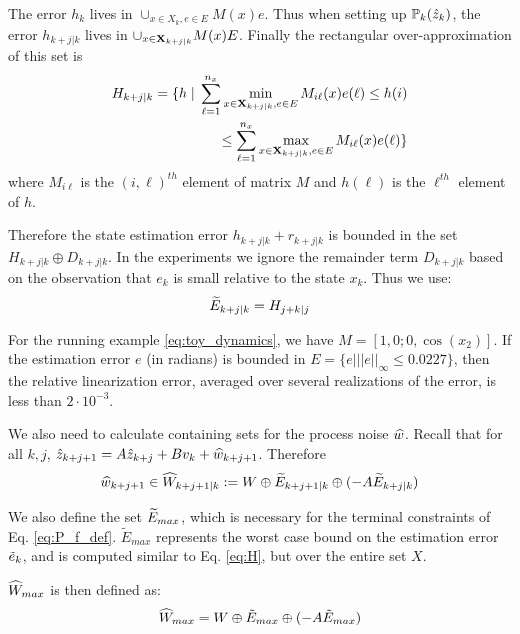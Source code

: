 The error $h_{k}$ lives in 
$\cup_{x\in X_{k}, e \in E}M(x)e$.
Thus when setting up $\mathbb{P}_{k}(\hat{z}_{k})$, the error $h_{k+j|k}$ lives in $\cup_{x \in \mathbf{X}_{k+j|k}}M(x)E$.
Finally the rectangular over-approximation of this set is 
\begin{eqnarray}
\label{eq:H}
H_{k+j|k} = \{h \;|\; \sum_{\ell=1}^{n_x} \min_{x \in \mathbf{X}_{k+j|k}, e \in E} M_{i\ell}(x)e(\ell)  \leq h(i) 
\nonumber 
\\
\leq \sum_{\ell=1}^{n_x} \max_{x \in \mathbf{X}_{k+j|k}, e \in E} M_{i\ell}(x)e(\ell) \}
\end{eqnarray}
where $M_{i\ell}$ is the $(i,\ell)^{th}$ element of matrix $M$ and $h(\ell)$ is the $\ell^{th}$ element of $h$.

Therefore the state estimation error $h_{k+j|k} + r_{k+j|k}$ is bounded in the set $H_{k+j|k} \oplus D_{k+j|k}$. 
In the experiments we ignore the remainder term $D_{k+j|k}$ based on the observation that $e_k$ is small relative to the state $x_k$. Thus we use:
\begin{eqnarray}
\label{eq:tildeE}
\widetilde{E}_{k+j|k} = H_{j+k|j}
\end{eqnarray}

\begin{exmp}
For the running example \eqref{eq:toy_dynamics}, we have $M = [1 ,  0;0 ,\cos(x_2)]$. 
If the estimation error $e$ (in radians) is bounded in $E = \lbrace e| ||e||_{\infty} \leq 0.0227\rbrace$,
then the relative linearization error, averaged over several realizations of the error, is less than $2\cdot 10^{-3}$.
\exmend
\end{exmp}

We also need to calculate containing sets for the process noise $\widehat{w}$.
Recall that for all $k,j$, 
$\hat{z}_{k+j+1} =  A\hat{z}_{k+j} + Bv_k + \widehat{w}_{k+j+1}$.
Therefore 
\begin{equation}
\label{eq:What}
\widehat{w}_{k+j+1} \in \widehat{W}_{k+j+1|k} := W \oplus \widetilde{E}_{k+j+1|k} \oplus(-A\widetilde{E}_{k+j|k})
\end{equation}

We also define the set $\widetilde{E}_{max}$, which is necessary for the terminal constraints of Eq. \eqref{eq:P_f_def}. $\tilde{E}_{max}$ represents the worst case bound on the estimation error $\tilde{e}_{k}$, and is computed similar to Eq. \eqref{eq:H}, but over the entire set $X$. %


$\widehat{W}_{max}$ is then defined as:
\begin{equation}
\widehat{W}_{max} = W \oplus \tilde{E}_{max} \oplus (-A\tilde{E}_{max})
\end{equation}
